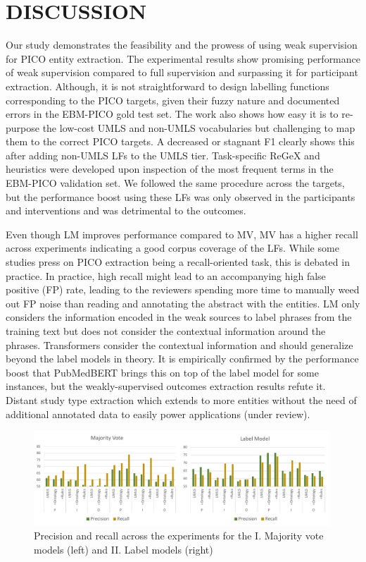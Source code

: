 \documentclass[10.7pt,]{article}
\begin{document}
\section{DISCUSSION}\label{discussion}
%
Our study demonstrates the feasibility and the prowess of using weak supervision for PICO entity extraction.
The experimental results show promising performance of weak supervision compared to full supervision and surpassing it for participant extraction.
Although, it is not straightforward to design labelling functions corresponding to the PICO targets, given their fuzzy nature and documented errors in the EBM-PICO gold test set.
The work also shows how easy it is to re-purpose the low-cost UMLS and non-UMLS vocabularies but challenging to map them to the correct PICO targets.
A decreased or stagnant F1 clearly shows this after adding non-UMLS LFs to the UMLS tier.
Task-specific ReGeX and heuristics were developed upon inspection of the most frequent terms in the EBM-PICO validation set.
We followed the same procedure across the targets, but the performance boost using these LFs was only observed in the participants and interventions and was detrimental to the outcomes.

Even though LM improves performance compared to MV, MV has a higher recall across experiments indicating a good corpus coverage of the LFs.
While some studies press on PICO extraction being a recall-oriented task, this is debated in practice.
In practice, high recall might lead to an accompanying high false positive (FP) rate, leading to the reviewers spending more time to manually weed out FP noise than reading and annotating the abstract with the entities\cite{liu2021sent2span}.
LM only considers the information encoded in the weak sources to label phrases from the training text but does not consider the contextual information around the phrases.
Transformers consider the contextual information and should generalize beyond the label models in theory.
It is empirically confirmed by the performance boost that PubMedBERT brings this on top of the label model for some instances, but the weakly-supervised outcomes extraction results refute it.
Distant study type extraction which extends to more entities without the need of additional annotated data to easily power applications (under review).
%
\begin{figure}[!h]
    \centering
    \includegraphics[width=0.99\textwidth]{figures/precRecall.pdf}
    \caption{Precision and recall across the experiments for the I. Majority vote models (left) and II. Label models (right)}
    \label{fig:precRecall}
\end{figure}
%
%
%
\end{document}
